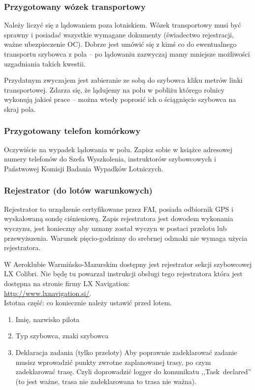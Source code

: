 \documentclass{article}
\begin{document}
\subsubsection{Przygotowany wózek transportowy}
Należy liczyć się z lądowaniem poza lotniskiem. 
Wózek transportowy musi być sprawny i posiadać wszystkie wymagane
dokumenty (świadectwo rejestracji, ważne ubezpieczenie OC). Dobrze jest
umówić się z kimś co do ewentualnego transportu szybowca z pola -- po
lądowaniu zazwyczaj mamy mniejsze możliwości uzgadniania takich kwestii.

Przydatnym zwyczajem jest zabieranie ze sobą do szybowca kliku metrów
linki transportowej. Zdarza się, że lądujemy na polu w pobliżu którego
rolnicy wykonują jakieś prace -- można wtedy poprosić ich o ściągnięcie
szybowca na skraj pola.

\subsubsection{Przygotowany telefon komórkowy}
Oczywiście na wypadek lądowania w polu. Zapisz sobie w książce adresowej
numery telefonów do Szefa Wyszkolenia, instruktorów szybowcowych i 
Państwowej Komisji Badania Wypadków Lotniczych.

\subsubsection{Rejestrator (do lotów warunkowych)}
Rejestrator to urządzenie certyfikowane przez FAI, posiada odbiornik
GPS i wyskalowaną sondę ciśnieniową. Zapis rejestratora jest dowodem
wykonania wyczynu, jest konieczny aby uznany został
wyczyn w postaci przelotu lub przewyższenia. Warunek pięcio-godzinny
do srebrnej odznaki nie wymaga użycia rejestratora.

W Aeroklubie Warmińsko-Mazurskim dostępny
jest rejestrator sekcji szybowcowej LX Colibri. Nie będę tu powarzał
instrukcji obsługi tego rejestratora która jest dostępna na stronie
firmy LX Navigation: \\
\url{http://www.lxnavigation.si/}. \\

\noindent
Istotna część: co koniecznie należy ustawić przed lotem.
\begin{enumerate}
\item Imię, nazwisko pilota
\item Typ szybowca, znaki szybowca
\item Deklaracja zadania (tylko przeloty)
    Aby poprawnie zadeklarować zadanie musisz wprowadzić punkty zwrotne
    zaplanowanej trasy, po czym zadeklarować trasę. Czyli doprowadzić
    logger do komunikatu ,,Task~declared'' (to jest ważne, trasa nie
    zadeklarowana to trasa nie ważna).
\end{enumerate}
\end{document}
